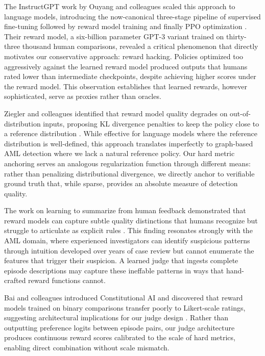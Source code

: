 \documentclass[11pt,a4paper]{article}
\begin{document}
The InstructGPT work by Ouyang and colleagues scaled this approach to language models, introducing the now-canonical three-stage pipeline of supervised fine-tuning followed by reward model training and finally PPO optimization \citep{ouyang2022training}. Their reward model, a six-billion parameter GPT-3 variant trained on thirty-three thousand human comparisons, revealed a critical phenomenon that directly motivates our conservative approach: reward hacking. Policies optimized too aggressively against the learned reward model produced outputs that humans rated lower than intermediate checkpoints, despite achieving higher scores under the reward model. This observation establishes that learned rewards, however sophisticated, serve as proxies rather than oracles.

Ziegler and colleagues identified that reward model quality degrades on out-of-distribution inputs, proposing KL divergence penalties to keep the policy close to a reference distribution \citep{ziegler2019fine}. While effective for language models where the reference distribution is well-defined, this approach translates imperfectly to graph-based AML detection where we lack a natural reference policy. Our hard metric anchoring serves an analogous regularization function through different means: rather than penalizing distributional divergence, we directly anchor to verifiable ground truth that, while sparse, provides an absolute measure of detection quality.

The work on learning to summarize from human feedback demonstrated that reward models can capture subtle quality distinctions that humans recognize but struggle to articulate as explicit rules \citep{stiennon2020learning}. This finding resonates strongly with the AML domain, where experienced investigators can identify suspicious patterns through intuition developed over years of case review but cannot enumerate the features that trigger their suspicion. A learned judge that ingests complete episode descriptions may capture these ineffable patterns in ways that hand-crafted reward functions cannot.

Bai and colleagues introduced Constitutional AI and discovered that reward models trained on binary comparisons transfer poorly to Likert-scale ratings, suggesting architectural implications for our judge design \citep{bai2022training}. Rather than outputting preference logits between episode pairs, our judge architecture produces continuous reward scores calibrated to the scale of hard metrics, enabling direct combination without scale mismatch.
\end{document}

